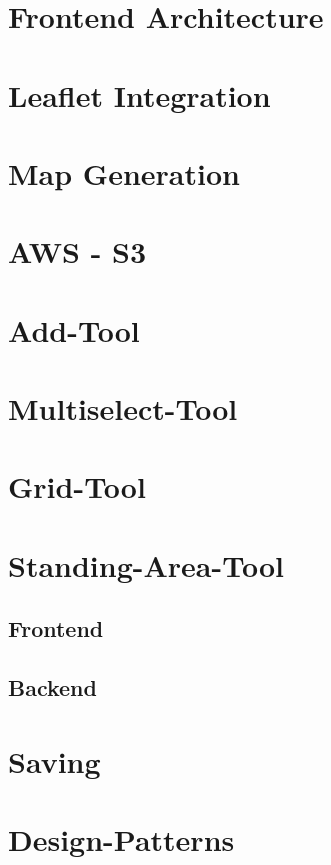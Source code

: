 \section{Frontend Architecture}


\section{Leaflet Integration}


\section{Map Generation}


\section{AWS - S3}


\section{Add-Tool}

\section{Multiselect-Tool}


\section{Grid-Tool}
\label{sec:grid-tool}

\section{Standing-Area-Tool}

\subsection{Frontend}

\subsection{Backend}


\section{Saving}


\section{Design-Patterns}
